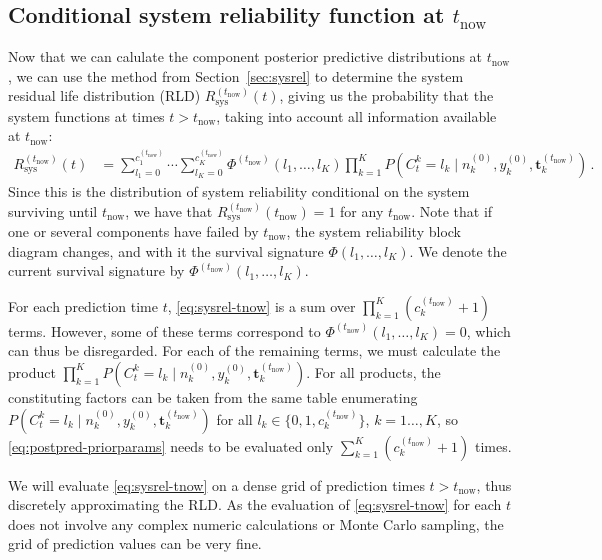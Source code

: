 \documentclass[authoryear]{elsarticle}
\renewcommand{\vec}[1]{{\bm#1}}
\newcommand{\uz}{^{(0)}} %
\def\ykz{y\uz_k}
\def\nkz{n\uz_k}
\def\tnow{t_\text{now}}
\newcommand{\Rsysnow}{R^{(t_\text{now})}_\text{sys}}
\def\cknow{c_k^{(\tnow)}}
\def\vectknow{\vec{t}_k^{(\tnow)}}
\def\Phinow{\Phi^{(\tnow)}}
\begin{document}
\subsection{Conditional system reliability function at $\tnow$}
\label{sec:sysreltnow}

Now that we can calulate the component posterior predictive distributions at $\tnow$,
we can use the method from Section~\ref{sec:sysrel}
to determine the system residual life distribution (RLD) $\Rsysnow(t)$,
giving us the probability that the system functions at times $t > \tnow$,
taking into account all information available at $\tnow$:
\begin{align}
\Rsysnow(t) &= \sum_{l_1=0}^{c_1^{(\tnow)}} \cdots \sum_{l_K=0}^{c_K^{(\tnow)}} \Phinow(l_1,\ldots,l_K)
               \prod_{k=1}^K P(C^k_t = l_k\mid\nkz,\ykz, \vectknow)\,.
\label{eq:sysrel-tnow}
\end{align}
Since this is the distribution of system reliability conditional on the system surviving until $\tnow$,
we have that $\Rsysnow(\tnow) = 1$ for any $\tnow$.
Note that if one or several components have failed by $\tnow$,
the system reliability block diagram changes, and with it the survival signature $\Phi(l_1,\ldots,l_K)$.
We denote the current survival signature by $\Phinow(l_1,\ldots,l_K)$.

For each prediction time $t$,
\eqref{eq:sysrel-tnow} is a sum over $\prod_{k=1}^K (\cknow + 1)$ terms.
However, some of these terms correspond to $\Phinow(l_1,\ldots,l_K) = 0$,
which can thus be disregarded.
For each of the remaining terms,
we must calculate the product $\prod_{k=1}^K P(C^k_t = l_k\mid\nkz,\ykz, \vectknow)$.
For all products, the constituting factors can be taken from the same table
enumerating $P(C^k_t = l_k\mid\nkz,\ykz, \vectknow)$ for all $l_k \in \{0, 1, \cknow\}$, $k=1\ldots,K$,
so \eqref{eq:postpred-priorparams} needs to be evaluated 
only $\sum_{k=1}^K (\cknow + 1)$ times.

We will evaluate \eqref{eq:sysrel-tnow} on a dense grid of prediction times $t > \tnow$,
thus discretely approximating the RLD.
As the evaluation of \eqref{eq:sysrel-tnow} for each $t$ does not involve any complex numeric calculations or Monte Carlo sampling,
the grid of prediction values can be very fine.
%
\end{document}
